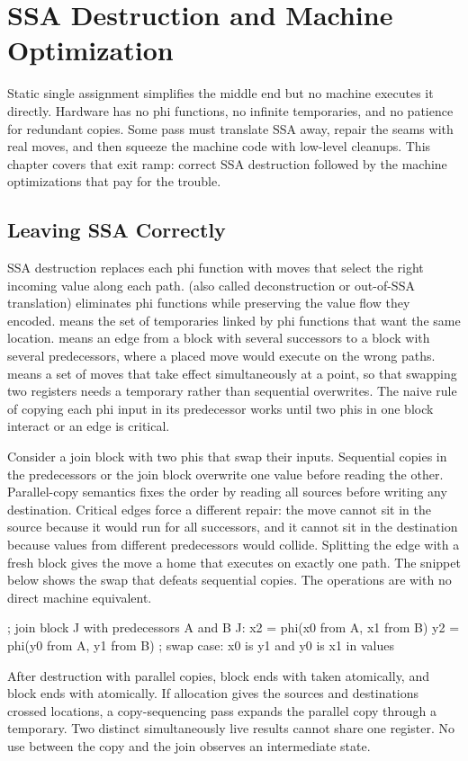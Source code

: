 \chapter{SSA Destruction and Machine Optimization}\label{ch:ssa-destruction-machine-opt}

Static single assignment simplifies the middle end but no machine executes it directly.
Hardware has no phi functions, no infinite temporaries, and no patience for redundant copies.
Some pass must translate SSA away, repair the seams with real moves, and then squeeze the machine code with low-level cleanups.
This chapter covers that exit ramp: correct SSA destruction followed by the machine optimizations that pay for the trouble.

\section{Leaving SSA Correctly}\label{sec:ch28-destruction}

SSA destruction replaces each phi function with moves that select the right incoming value along each path.
 (also called deconstruction or out-of-SSA translation) eliminates phi functions while preserving the value flow they encoded.
 means the set of temporaries linked by phi functions that want the same location.
 means an edge from a block with several successors to a block with several predecessors, where a placed move would execute on the wrong paths.
 means a set of moves that take effect simultaneously at a point, so that swapping two registers needs a temporary rather than sequential overwrites.
The naive rule of copying each phi input in its predecessor works until two phis in one block interact or an edge is critical.

Consider a join block with two phis that swap their inputs.
Sequential copies in the predecessors or the join block overwrite one value before reading the other.
Parallel-copy semantics fixes the order by reading all sources before writing any destination.
Critical edges force a different repair: the move cannot sit in the source because it would run for all successors, and it cannot sit in the destination because values from different predecessors would collide.
Splitting the edge with a fresh block gives the move a home that executes on exactly one path.
The snippet below shows the swap that defeats sequential copies.
The  operations are  with no direct machine equivalent.
\begin{irlisting}
; join block J with predecessors A and B
J: x2 = phi(x0 from A, x1 from B)
   y2 = phi(y0 from A, y1 from B)
; swap case: x0 is y1 and y0 is x1 in values
\end{irlisting}
After destruction with parallel copies, block  ends with  taken atomically, and block  ends with  atomically.
If allocation gives the sources and destinations crossed locations, a copy-sequencing pass expands the parallel copy through a temporary.
Two distinct simultaneously live results cannot share one register.
No use between the copy and the join observes an intermediate state.


